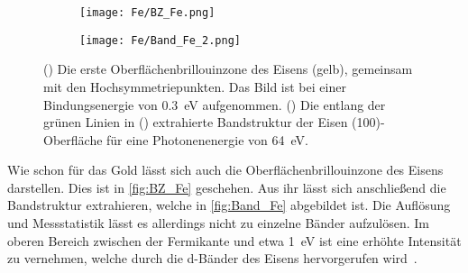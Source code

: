         \begin{figure}
            \begin{subfigure}[t]{0.34\textwidth}
                \centering
                \texttt{[image: Fe/BZ\_Fe.png]}
                \subcaption{}
                \label{fig:BZ_Fe}
            \end{subfigure}
            \begin{subfigure}[t]{0.62\textwidth}
                \centering
                \texttt{[image: Fe/Band\_Fe\_2.png]}
                \subcaption{}
                \label{fig:Band_Fe}
            \end{subfigure}
            \caption{() Die erste Oberflächenbrillouinzone des Eisens (gelb), gemeinsam mit den Hochsymmetriepunkten. Das Bild ist bei einer Bindungsenergie von \SI{0.3}{\electronvolt} aufgenommen.
            () Die entlang der grünen Linien in () extrahierte Bandstruktur der Eisen (100)-Oberfläche für eine Photonenenergie von \SI{64}{\electronvolt}.}
        \end{figure}
        Wie schon für das Gold lässt sich auch die Oberflächenbrillouinzone des Eisens darstellen. 
        Dies ist in \autoref{fig:BZ_Fe} geschehen.
        Aus ihr lässt sich anschließend die Bandstruktur extrahieren, welche in \autoref{fig:Band_Fe} abgebildet ist.
        Die Auflösung und Messstatistik lässt es allerdings nicht zu einzelne Bänder aufzulösen. %
        Im oberen Bereich zwischen der Fermikante und etwa \SI{1}{\electronvolt} ist eine erhöhte Intensität zu vernehmen, welche durch die d-Bänder des Eisens hervorgerufen wird~\cite{callaway_energy_1977}.        

